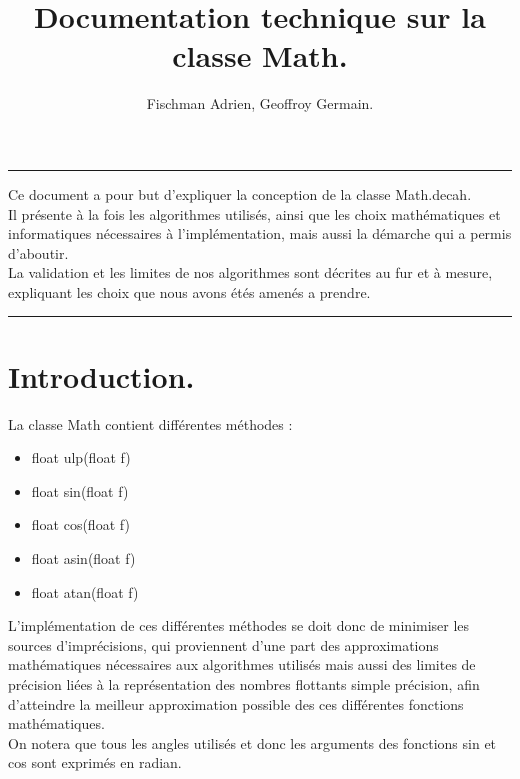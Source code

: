 \documentclass[a4,12pt]{article}
\begin{document}
\begin{titlepage}
\title{ Documentation technique sur la classe Math.}
\author{Fischman Adrien, Geoffroy Germain.}
\date{}

\maketitle

\rule[0.5ex]{\textwidth}{0.2mm}
Ce document a pour but d'expliquer la conception de la classe Math.decah.\\
Il présente à la fois les algorithmes utilisés, ainsi que les choix mathématiques et informatiques nécessaires à l'implémentation, mais aussi la démarche qui a permis d'aboutir.\\
La validation et les limites de nos algorithmes sont décrites au fur et à mesure, expliquant les choix que nous avons étés amenés a prendre.

\rule[0.5ex]{\textwidth}{0.2mm}

\end{titlepage}
\tableofcontents
\newpage
\section{Introduction.}
La classe Math contient différentes méthodes :
\begin{itemize}
    \item float ulp(float f)
    \item float sin(float f)
    \item float cos(float f)
    \item float asin(float f)
    \item float atan(float f)
\end{itemize}
L'implémentation de ces différentes méthodes se doit donc de minimiser les sources d'imprécisions, qui proviennent d'une part des approximations mathématiques nécessaires aux algorithmes utilisés mais aussi des limites de précision liées à la représentation des nombres flottants simple précision, afin d'atteindre la meilleur approximation possible des ces différentes fonctions mathématiques.\\
On notera que tous les angles utilisés et donc les arguments des fonctions sin et cos sont exprimés en radian.\\
\end{document}
